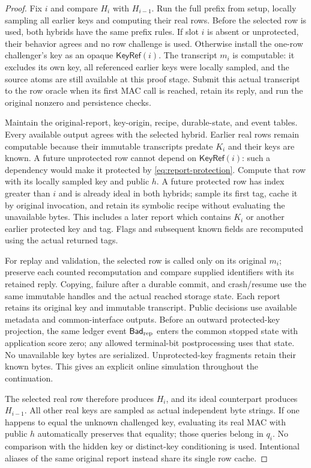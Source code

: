 \begin{proof}
Fix $i$ and compare $H_i$ with $H_{i-1}$.  Run the full prefix from setup,
locally sampling all earlier keys and computing their real rows.  Before the
selected row is used, both hybrids have the same prefix rules.  If slot $i$
is absent or unprotected, their behavior agrees and no row challenge is used.
Otherwise install the one-row challenger's key as an opaque
$\mathsf{KeyRef}(i)$.  The transcript $m_i$ is computable: it excludes its own
key, all referenced earlier keys were locally sampled, and the source atoms
are still available at this proof stage.  Submit this actual transcript to
the row oracle when its first MAC call is reached, retain its reply, and run
the original nonzero and persistence checks.

Maintain the original-report, key-origin, recipe, durable-state, and event
tables.  Every available output agrees with the selected hybrid.  Earlier
real rows remain computable because their immutable transcripts predate
$K_i$ and their keys are known.  A future unprotected row cannot depend on
$\mathsf{KeyRef}(i)$: such a dependency would make it protected by
\eqref{eq:report-protection}.  Compute that row with its locally sampled key
and public $h$.  A future protected row has index greater than $i$ and is
already ideal in both hybrids; sample its first tag, cache it by original
invocation, and retain its symbolic recipe without evaluating the unavailable
bytes.  This includes a later report which contains $K_i$ or another earlier
protected key and tag.  Flags and subsequent known fields are recomputed
using the actual returned tags.

For replay and validation, the selected row is called only on its original
$m_i$; preserve each counted recomputation and compare supplied identifiers
with its retained reply.  Copying, failure after a durable commit, and
crash/resume use the same immutable handles and the actual reached storage
state. Each report retains its original key and immutable transcript. Public decisions
use available metadata and common-interface outputs.  Before an outward
protected-key projection, the same ledger event
$\mathsf{Bad}_{\rm rep}$ enters the common stopped state with application
score zero; any allowed terminal-bit postprocessing uses that state.  No
unavailable key bytes are serialized.  Unprotected-key fragments retain their known bytes.
This gives an explicit online simulation throughout the continuation.

The selected real row therefore produces $H_i$, and its ideal counterpart
produces $H_{i-1}$.  All other real keys are sampled as actual independent byte
strings.  If one happens to equal the unknown challenged key, evaluating its
real MAC with public $h$ automatically preserves that equality; those queries
belong in $q_i$.  No comparison with the hidden key or distinct-key conditioning
is used.  Intentional aliases of the same original report instead share its
single row cache.


\end{proof}
